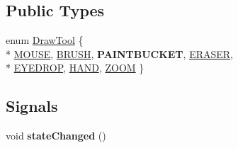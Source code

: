 \subsection*{Public Types}
\begin{DoxyCompactItemize}
\item 
enum \hyperlink{classGLWidget_a9fba3eba78950865febd4547be0641d0}{Draw\-Tool} \{ \\*
\hyperlink{classGLWidget_a9fba3eba78950865febd4547be0641d0a53197083abb268d80465c7af0071bfe7}{M\-O\-U\-S\-E}, 
\hyperlink{classGLWidget_a9fba3eba78950865febd4547be0641d0a13dba4ab40790d00786f83a8af372a37}{B\-R\-U\-S\-H}, 
{\bfseries P\-A\-I\-N\-T\-B\-U\-C\-K\-E\-T}, 
\hyperlink{classGLWidget_a9fba3eba78950865febd4547be0641d0a36a243e579dcf431ca1bf5306f9b3459}{E\-R\-A\-S\-E\-R}, 
\\*
\hyperlink{classGLWidget_a9fba3eba78950865febd4547be0641d0ab9c3b71d6caf455913325367c4d00862}{E\-Y\-E\-D\-R\-O\-P}, 
\hyperlink{classGLWidget_a9fba3eba78950865febd4547be0641d0ab807fc933b2f87fde055dd12b61a9ec2}{H\-A\-N\-D}, 
\hyperlink{classGLWidget_a9fba3eba78950865febd4547be0641d0a28331a2b609c88af7845259f23271151}{Z\-O\-O\-M}
 \}
\end{DoxyCompactItemize}
\subsection*{Signals}
\begin{DoxyCompactItemize}
\item 
\hypertarget{classGLWidget_a4a11176bfcdf51d04a18d4383bde7a58}{void {\bfseries state\-Changed} ()}\label{classGLWidget_a4a11176bfcdf51d04a18d4383bde7a58}

\end{DoxyCompactItemize}
